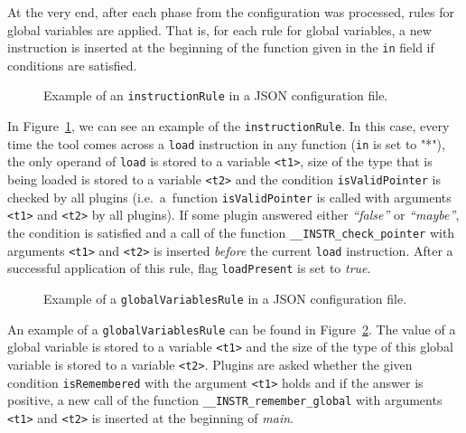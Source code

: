 At the very end, after each phase from the configuration was processed, rules
for global variables are applied. That is, for each rule for global variables,
    a new instruction is inserted at the beginning of the function given in the
    \texttt{in} field if conditions are satisfied.


\begin{figure}[h]

\caption{Example of an \texttt{instructionRule} in a JSON configuration file.}
\label{fig:json_example}
\end{figure}

In Figure~\ref{fig:json_example}, we can see an example of the
\texttt{instructionRule}. In this case, every time the tool comes across a
\texttt{load} instruction in any function (\texttt{in} is set to "*"), the only
operand of \texttt{load} is stored to a variable \texttt{<t1>}, size of the
type that is being loaded is stored to a variable \texttt{<t2>} and the condition
\texttt{isValidPointer} is checked by all plugins (i.e.~a~function
\texttt{isValidPointer} is called with arguments \texttt{<t1>} and
\texttt{<t2>} by all plugins). If some plugin answered either \emph{``false''} or
\emph{``maybe''}, the condition is satisfied and a call of the function
\texttt{\_\_INSTR\_check\_pointer} with arguments \texttt{<t1>} and
\texttt{<t2>} is inserted \emph{before} the current \texttt{load} instruction.
After a successful application of this rule, flag \texttt{loadPresent} is set
to \emph{true}.

\begin{figure}[h]

\caption{Example of a \texttt{globalVariablesRule} in a JSON configuration file.}
\label{fig:json_example2}
\end{figure}

An example of a \texttt{globalVariablesRule} can be found in
Figure~\ref{fig:json_example2}. The value of a global variable is stored to a
variable \texttt{<t1>} and the size of the type of this global variable is stored to
a variable \texttt{<t2>}. Plugins are asked whether the given condition
\texttt{isRemembered} with the argument \texttt{<t1>} holds and if the answer is
positive, a new call of the function \texttt{\_\_INSTR\_remember\_global} with
arguments \texttt{<t1>} and \texttt{<t2>} is inserted at the beginning of
\emph{main}.

